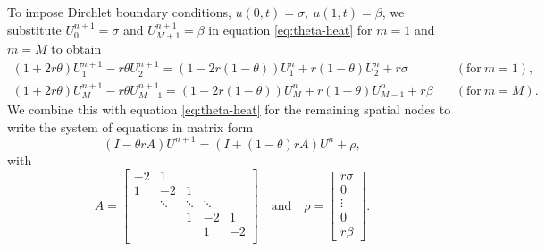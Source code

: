 To impose Dirchlet boundary conditions, $u(0, t) = \sigma, \: u(1, t) = \beta$, 
we substitute $U_0^{n+1} = \sigma$ and $U_{M+1}^{n+1} = \beta$ in equation \eqref{eq:theta-heat} for $m=1$ and $m=M$ to obtain 
\begin{align*}
    \left(1+2r\theta\right)U_1^{n+1} - r\theta U_2^{n+1} = \left(1-2r(1-\theta)\right)U_1^n + r\left(1-\theta\right)U_2^n + r\sigma
    \quad & (\text{for} \: m=1), \\
    \left(1+2r\theta\right)U_{M}^{n+1} - r\theta U_{M-1}^{n+1} = \left(1-2r(1-\theta)\right)U_{M}^n + r\left(1-\theta\right)U_{M-1}^n + r\beta
    \quad & (\text{for} \: m=M). 
\end{align*}
We combine this with equation \ref{eq:theta-heat} for the remaining spatial nodes to write the system of equations in matrix form
\begin{equation}
    \left(I - \theta r A\right)U^{n+1} = \left(I + (1-\theta)r A\right)U^n+\rho, 
    \label{eq:theta-heat-matrix}
\end{equation}
with 
\begin{equation}
    A = 
    \begin{bmatrix}
    -2 & 1 \\
    1 & -2 & 1 & \\
      & \ddots & \ddots & \ddots & \\
      &   & 1 & -2 & 1 \\
      &   &  & 1 & -2 \\
    \end{bmatrix}
    \quad \text{and} \quad
    \rho = 
    \begin{bmatrix}
        r\sigma \\ 0 \\ \vdots \\ 0 \\ r\beta
    \end{bmatrix}
    .
    \label{eq:theta-heat-matrix-dirchlet}
\end{equation}

